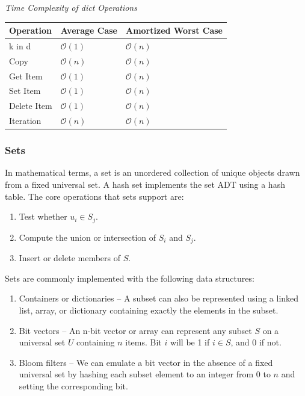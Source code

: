 \documentclass{article}
\newcommand{\bigO}{\mathcal{O}}
\begin{document}
   \vspace{8pt} \emph{Time Complexity of dict Operations}
    \begin{table}[H]
        \begin{tabular}{|l|l|l|}
            \hline
            \textbf{Operation} & \textbf{Average Case} & \textbf{Amortized Worst Case} \\
            \hline
            k in d & $\bigO(1)$ & $\bigO(n)$ \\
            Copy & $\bigO(n)$ & $\bigO(n)$ \\
            Get Item & $\bigO(1)$ & $\bigO(n)$ \\
            Set Item & $\bigO(1)$ & $\bigO(n)$ \\
            Delete Item & $\bigO(1)$ & $\bigO(n)$ \\
            Iteration & $\bigO(n)$ & $\bigO(n)$ \\
            \hline
        \end{tabular}
    \end{table}
    
    \subsubsection{Sets}
    In mathematical terms, a set is an unordered collection of unique objects drawn from a fixed universal set. A hash set implements the set ADT using a hash table. The core operations that sets support are:
    
    \begin{enumerate}
        \item Test whether $u_i \in S_j$.
        \item Compute the union or intersection of $S_i$ and $S_j$.
        \item Insert or delete members of $S$.
    \end{enumerate}
    
    Sets are commonly implemented with the following data structures:
    
    \begin{enumerate}
        \item Containers or dictionaries – A subset can also be represented using a linked list, array, or dictionary containing exactly the elements in the subset.
        \item Bit vectors – An n-bit vector or array can represent any subset $S$ on a universal set $U$ containing $n$ items. Bit $i$ will be 1 if $i \in S$, and $0$ if not.
        \item Bloom filters – We can emulate a bit vector in the absence of a fixed universal set by hashing each subset element to an integer from $0$ to $n$ and setting the corresponding bit.
    \end{enumerate}
    
\end{document}
